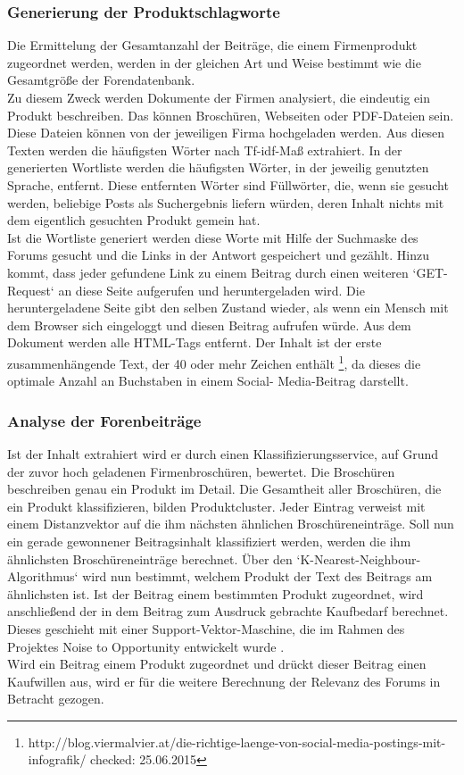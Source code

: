 \subsubsection{Generierung der Produktschlagworte}
Die Ermittelung der Gesamtanzahl der Beiträge, die einem Firmenprodukt zugeordnet werden, werden in der gleichen Art und Weise bestimmt wie die Gesamtgröße der Forendatenbank.\\
Zu diesem Zweck werden Dokumente der Firmen analysiert, die eindeutig ein Produkt beschreiben. Das können Broschüren, Webseiten oder PDF-Dateien sein. Diese Dateien können von der jeweiligen Firma hochgeladen werden. Aus diesen Texten werden die häufigsten Wörter nach Tf-idf-Maß extrahiert. In der generierten Wortliste werden die häufigsten Wörter, in der jeweilig genutzten Sprache, entfernt. Diese entfernten Wörter sind Füllwörter, die, wenn sie gesucht werden, beliebige Posts als Suchergebnis liefern würden, deren Inhalt nichts mit dem eigentlich gesuchten Produkt gemein hat.\\
Ist die Wortliste generiert werden diese Worte mit Hilfe der Suchmaske des Forums gesucht und die Links in der Antwort gespeichert und gezählt. Hinzu kommt, dass jeder gefundene Link zu einem Beitrag durch einen weiteren `GET-Request` an diese Seite aufgerufen und heruntergeladen wird. Die heruntergeladene Seite gibt den selben Zustand wieder, als wenn ein Mensch mit dem Browser sich eingeloggt und diesen Beitrag aufrufen würde. Aus dem Dokument werden alle HTML-Tags entfernt. Der Inhalt ist der erste zusammenhängende Text, der 40 oder mehr Zeichen enthält \footnote{http://blog.viermalvier.at/die-richtige-laenge-von-social-media-postings-mit-infografik/ checked: 25.06.2015}, da dieses die optimale Anzahl an Buchstaben in einem Social- Media-Beitrag darstellt.

\subsubsection{Analyse der Forenbeiträge}
Ist der Inhalt extrahiert wird er durch einen Klassifizierungsservice, auf Grund der zuvor hoch geladenen Firmenbroschüren, bewertet. Die Broschüren beschreiben genau ein Produkt im Detail. Die Gesamtheit aller Broschüren, die ein Produkt klassifizieren, bilden Produktcluster. Jeder Eintrag verweist mit einem Distanzvektor auf die ihm nächsten ähnlichen Broschüreneinträge. Soll nun ein gerade gewonnener Beitragsinhalt klassifiziert werden, werden die ihm ähnlichsten Broschüreneinträge berechnet. Über den `K-Nearest-Neighbour-Algorithmus` wird nun bestimmt, welchem Produkt der Text des Beitrags am ähnlichsten ist. Ist der Beitrag einem bestimmten Produkt zugeordnet, wird anschließend der in dem Beitrag zum Ausdruck gebrachte Kaufbedarf berechnet. Dieses geschieht mit einer Support-Vektor-Maschine, die im Rahmen des Projektes Noise to Opportunity entwickelt wurde \cite{n2o}.\\
Wird ein Beitrag einem Produkt zugeordnet und drückt dieser Beitrag einen Kaufwillen aus, wird er für die weitere Berechnung der Relevanz des Forums in Betracht gezogen.

